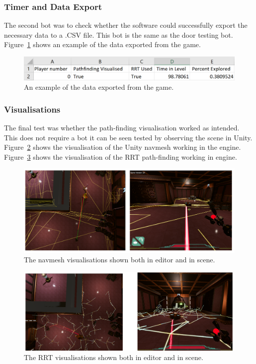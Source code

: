 \documentclass[journal]{IEEEtran}
\begin{document}
	\subsubsection{Timer and Data Export}
	The second bot was to check whether the software could successfully export the necessary data to a .CSV file. This bot is the same as the door testing bot. Figure~\ref{image:ExportData} shows an example of the data exported from the game.  
	
	\begin{figure}[h]
		\includegraphics[width=1.0\linewidth]{ExportData.png}
		\caption{An example of the data exported from the game.}
		\label{image:ExportData}
	\end{figure} 
	
	\subsubsection{Visualisations}
	The final test was whether the path-finding visualisation worked as intended. This does not require a bot it can be seen tested by observing the scene in Unity. Figure~\ref{image:navmeshVisuals} shows the visualisation of the Unity navmesh working in the engine.  Figure~\ref{image:RRTVisuals} shows the visualisation of the RRT path-finding working in engine.
	
	\begin{figure}[h]
		\includegraphics[width=1.0\linewidth]{NavmeshVis.png}
		\caption{The navmesh visualisations shown both in editor and in scene.}
		\label{image:navmeshVisuals}
	\end{figure}  
	
	
	\begin{figure}[h]
		\includegraphics[width=1.0\linewidth]{RRTVis.png}
		\caption{The RRT visualisations shown both in editor and in scene.}
		\label{image:RRTVisuals}
	\end{figure}  
	
\end{document}
